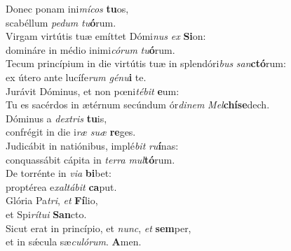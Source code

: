 \evenverse Donec ponam ini\textit{mí}\textit{cos} \textbf{tu}os,~\*\\
\evenverse scabéllum \textit{pe}\textit{dum} \textit{tu}\textbf{ó}rum.\\
\oddverse Virgam virtútis tuæ emíttet Dómi\textit{nus} \textit{ex} \textbf{Si}on:~\*\\
\oddverse domináre in médio inimi\textit{có}\textit{rum} \textit{tu}\textbf{ó}rum.\\
\evenverse Tecum princípium in die virtútis tuæ in splendóri\textit{bus} \textit{san}\textbf{ctó}rum:~\*\\
\evenverse ex útero ante lucífe\textit{rum} \textit{gé}\textit{nu}\textbf{i} te.\\
\oddverse Jurávit Dóminus, et non pœni\textit{té}\textit{bit} \textbf{e}um:~\*\\
\oddverse Tu es sacérdos in ætérnum secúndum ór\textit{di}\textit{nem} \textit{Mel}\textbf{chí}\textbf{se}dech.\\
\evenverse Dóminus a \textit{dex}\textit{tris} \textbf{tu}is,~\*\\
\evenverse confrégit in die i\textit{ræ} \textit{su}\textit{æ} \textbf{re}ges.\\
\oddverse Judicábit in natiónibus, implé\textit{bit} \textit{ru}\textbf{í}nas:~\*\\
\oddverse conquassábit cápita in \textit{ter}\textit{ra} \textit{mul}\textbf{tó}rum.\\
\evenverse De torrénte in \textit{vi}\textit{a} \textbf{bi}bet:~\*\\
\evenverse proptérea e\textit{xal}\textit{tá}\textit{bit} \textbf{ca}put.\\
\oddverse Glória Pa\textit{tri}, \textit{et} \textbf{Fí}lio,~\*\\
\oddverse et Spi\textit{rí}\textit{tu}\textit{i} \textbf{San}cto.\\
\evenverse Sicut erat in princípio, et \textit{nunc}, \textit{et} \textbf{sem}per,~\*\\
\evenverse et in sǽcula sæ\textit{cu}\textit{ló}\textit{rum}. \textbf{A}men.\\
